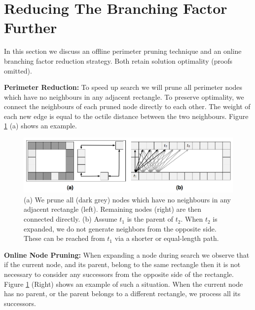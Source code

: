 \section{Reducing The Branching Factor Further}
In this section we discuss an offline perimeter pruning technique
and an online branching factor reduction strategy.
Both retain solution optimality (proofs omitted).

\noindent
\textbf{Perimeter Reduction:}
To speed up search we will prune all perimeter nodes which have no 
neighbours in any adjacent rectangle.
To preserve optimality, we connect the neighbours of each pruned node directly to each other.  The weight
of each new edge is equal to the octile distance between the two
neighbours.  Figure \ref{fig-branching} (a) shows an example.  

\begin{figure}[t]
	\begin{center}
	\includegraphics[width=0.97\columnwidth, trim = 10mm 10mm 10mm 0mm]
	{diagrams/branching_wide.png}
	\end{center}
	\vspace{-3pt}
	\caption{(a) We prune all (dark grey) nodes which
	have no neighbours in any adjacent rectangle (left). 
	Remaining nodes (right) are then connected directly.
	(b) Assume $t_{1}$ is the parent of $t_2$. When $t_2$
	is expanded, we do not generate neighbors from the opposite side.
	These can be reached from $t_1$ via a shorter or equal-length path.
}
\label{fig-branching}
\end{figure}

\noindent
\textbf{Online Node Pruning:}
When expanding a node during search we observe that if the current
node, and its parent, belong to the same rectangle then it is not
necessary to consider any successors from the opposite side of the rectangle.
Figure \ref{fig-branching} (Right) shows an example of such a situation. 
When the current node has no parent, or the parent belongs to a different rectangle, 
we process all its successors.
